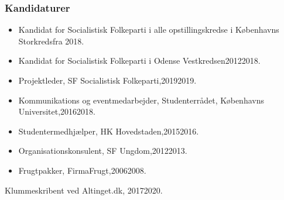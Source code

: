 \documentclass[11pt, a4paper]{awesome-cv}
\begin{document}
\begin{cvletter}
\subsubsection*{Kandidaturer}
\begin{itemize}
\item Kandidat for Socialistisk Folkeparti i alle opstillingskredse i Københavns Storkredsfra 2018.
\item Kandidat for Socialistisk Folkeparti i Odense Vestkredsen20122018.
\end{itemize}
\begin{itemize}
\item Projektleder, SF  Socialistisk Folkeparti,20192019.
\item Kommunikations og eventmedarbejder, Studenterrådet, Københavns Universitet,20162018.
\item Studentermedhjælper, HK Hovedstaden,20152016.
\item Organisationskonsulent, SF Ungdom,20122013.
\item Frugtpakker, FirmaFrugt,20062008.
\end{itemize}
Klummeskribent ved Altinget.dk, 20172020.

\end{cvletter}
\end{document}
